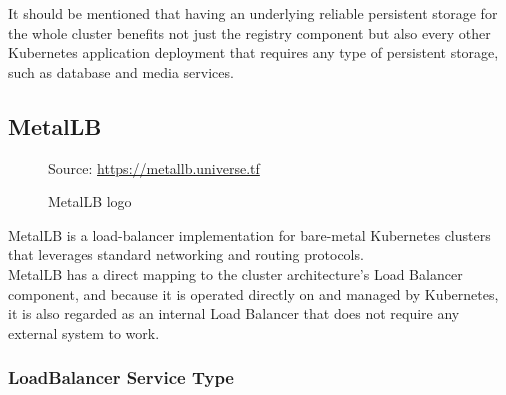 It should be mentioned that having an underlying reliable persistent storage for
the whole cluster benefits not just the registry component but also every other
Kubernetes application deployment that requires any type of persistent storage, such
as database and media services.

\subsection{MetalLB}
\label{subsec:implementation_dependencies_metallb}

\begin{figure} %
  \centering
  \def\stackalignment{l} %
  {\scriptsize \parbox[t]{\linewidth}{ Source: \url{https://metallb.universe.tf}} }
  \caption{MetalLB logo}
\end{figure}

MetalLB is a load-balancer implementation for bare-metal Kubernetes clusters that
leverages standard networking and routing protocols\cite{metallb}. \\ %
MetalLB has a direct mapping to the cluster architecture's Load Balancer
component, and because it is operated directly on and managed by Kubernetes, it
is also regarded as an internal Load Balancer that does not require any external
system to work.

\subsubsection{LoadBalancer Service Type}
\label{subsubsec:implementation_dependencies_metallb__loadbalancer_service_type}

